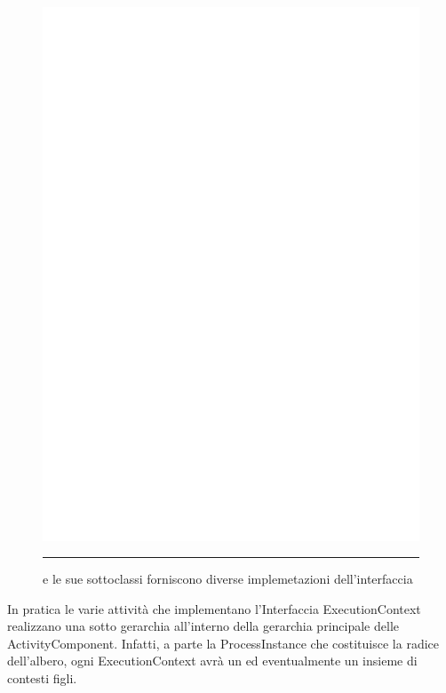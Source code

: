 \begin{figure}[t!]
\begin{center}
\includegraphics[scale=0.85]
{architettura_interna/dia/cntxclass}
\caption[ExecutionContext Class Diagram]{
   	 e le sue sottoclassi forniscono 
   	diverse implemetazioni dell'interfaccia	 }
   	\rule{7cm}{0.01cm}
  \label{fig:cntxclass}
\end{center}
\end{figure}

In pratica le varie attività che implementano l'Interfaccia ExecutionContext
realizzano una sotto gerarchia all'interno della gerarchia principale delle
ActivityComponent. Infatti, a parte la ProcessInstance che costituisce la
radice dell'albero, ogni ExecutionContext avrà un  ed
eventualmente un insieme di contesti figli.

